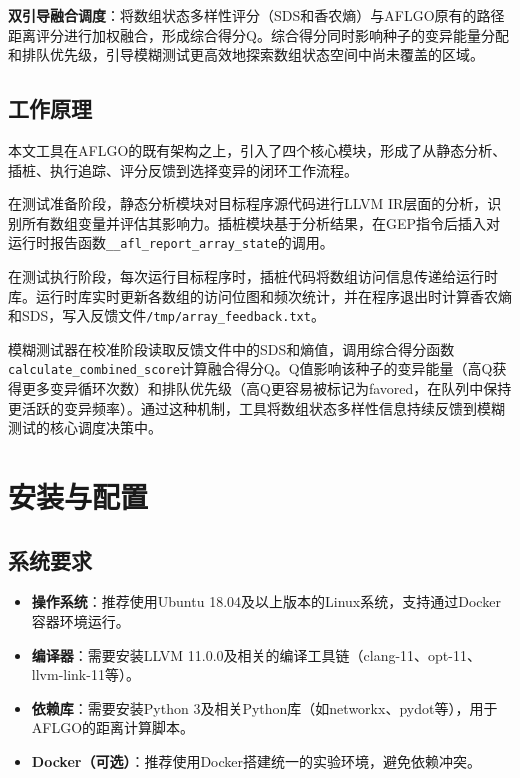 \documentclass[bachelor]{njupthesis}
\begin{document}
\textbf{双引导融合调度}：将数组状态多样性评分（SDS和香农熵）与AFLGO原有的路径距离评分进行加权融合，形成综合得分Q。综合得分同时影响种子的变异能量分配和排队优先级，引导模糊测试更高效地探索数组状态空间中尚未覆盖的区域。

\subsection{工作原理}

本文工具在AFLGO的既有架构之上，引入了四个核心模块，形成了从静态分析、插桩、执行追踪、评分反馈到选择变异的闭环工作流程。

在测试准备阶段，静态分析模块对目标程序源代码进行LLVM IR层面的分析，识别所有数组变量并评估其影响力。插桩模块基于分析结果，在GEP指令后插入对运行时报告函数\texttt{\_\_afl\_report\_array\_state}的调用。

在测试执行阶段，每次运行目标程序时，插桩代码将数组访问信息传递给运行时库。运行时库实时更新各数组的访问位图和频次统计，并在程序退出时计算香农熵和SDS，写入反馈文件\texttt{/tmp/array\_feedback.txt}。

模糊测试器在校准阶段读取反馈文件中的SDS和熵值，调用综合得分函数\texttt{calculate\_combined\_score}计算融合得分Q。Q值影响该种子的变异能量（高Q获得更多变异循环次数）和排队优先级（高Q更容易被标记为favored，在队列中保持更活跃的变异频率）。通过这种机制，工具将数组状态多样性信息持续反馈到模糊测试的核心调度决策中。

\section{安装与配置}

\subsection{系统要求}

\begin{itemize}
\item \textbf{操作系统}：推荐使用Ubuntu 18.04及以上版本的Linux系统，支持通过Docker容器环境运行。
\item \textbf{编译器}：需要安装LLVM 11.0.0及相关的编译工具链（clang-11、opt-11、llvm-link-11等）。
\item \textbf{依赖库}：需要安装Python 3及相关Python库（如networkx、pydot等），用于AFLGO的距离计算脚本。
\item \textbf{Docker（可选）}：推荐使用Docker搭建统一的实验环境，避免依赖冲突。
\end{itemize}
\end{document}
